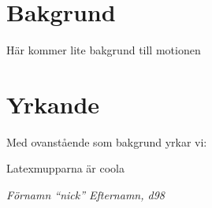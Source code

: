 \documentclass{dtek}
\begin{document}
\maketitle

\section*{Bakgrund}

Här kommer lite bakgrund till motionen 

\section*{Yrkande}
Med ovanstående som bakgrund yrkar vi:

\begin{attsatser}
  \att Latexmupparna är coola
\end{attsatser}


\textit{Förnamn \enquote{nick} Efternamn, d98}
\end{document}
